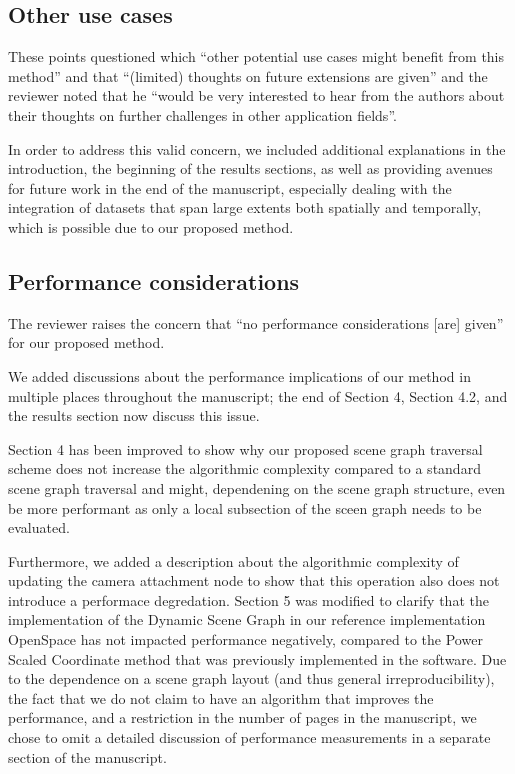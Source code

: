 \documentclass{article}
\begin{document}
\vspace*{1cm}

\begin{tcolorbox}
\subsection{Other use cases}\label{concern:applications}
These points questioned which ``other potential use cases might benefit from this method'' and that ``(limited) thoughts on future extensions are given'' and the reviewer noted that he ``would be very interested to hear from the authors about their thoughts on further challenges in other application fields''.
\end{tcolorbox}
In order to address this valid concern, we included additional explanations in the introduction, the beginning of the results sections, as well as providing avenues for future work in the end of the manuscript, especially dealing with the integration of datasets that span large extents both spatially and temporally, which is possible due to our proposed method.

\vspace*{1cm}

\begin{tcolorbox}
\subsection{Performance considerations}\label{concern:performance}
The reviewer raises the concern that ``no performance considerations [are] given'' for our proposed method.
\end{tcolorbox}
We added discussions about the performance implications of our method in multiple places throughout the manuscript; the end of Section 4, Section 4.2, and the results section now discuss this issue.

Section 4 has been improved to show why our proposed scene graph traversal scheme does not increase the algorithmic complexity compared to a standard scene graph traversal and might, dependening on the scene graph structure, even be more performant as only a local subsection of the sceen graph needs to be evaluated.

Furthermore, we added a description about the algorithmic complexity of updating the camera attachment node to show that this operation also does not introduce a performace degredation.
Section 5 was modified to clarify that the implementation of the Dynamic Scene Graph in our reference implementation OpenSpace has not impacted performance negatively, compared to the Power Scaled Coordinate method that was previously implemented in the software.
Due to the dependence on a scene graph layout (and thus general irreproducibility), the fact that we do not claim to have an algorithm that improves the performance, and a restriction in the number of pages in the manuscript, we chose to omit a detailed discussion of performance measurements in a separate section of the manuscript.
\end{document}

